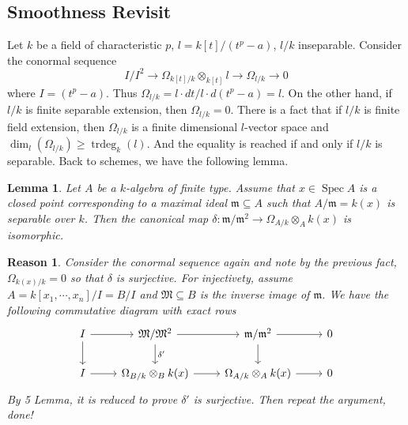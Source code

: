 \documentclass{ctexart}
\newtheorem{lemma}{Lemma}[section]
\newtheorem{reason}{Reason}[section]
\newcommand{\trdeg}{\operatorname{trdeg}}
\newcommand{\spec}{\operatorname{Spec}}
\begin{document}
\subsection{Smoothness Revisit}
Let $k$ be a field of characteristic $p$, $l = k[t]/(t^{p} - a)$, $l/k$ inseparable.
Consider the conormal sequence 
\begin{equation*}
    I/I^{2} \longrightarrow \Omega_{k[t]/k} \otimes_{k[t]} l \longrightarrow \Omega_{l/k} \longrightarrow 0
\end{equation*}
where $I = (t^{p} - a)$.
Thus $\Omega_{l/k} = l \cdot dt/l \cdot d(t^{p} - a) = l$.
On the other hand, if $l/k$ is finite separable extension, then $\Omega_{l/k} = 0$.
There is a fact that if $l/k$ is finite field extension, then $\Omega_{l/k}$ is a finite dimensional $l$-vector space and $\dim_{l}(\Omega_{l/k}) \ge \trdeg_{k}(l)$.
And the equality is reached if and only if $l/k$ is separable.
Back to schemes, we have the following lemma.
\begin{lemma}
    Let $A$ be a $k$-algebra of finite type.
    Assume that $x\in \spec A$ is a closed point corresponding to a maximal ideal $\mathfrak{m} \subseteq A$ such that $A/\mathfrak{m} = k(x)$ is separable over $k$.
    Then the canonical map $\delta: \mathfrak{m}/\mathfrak{m}^{2} \longrightarrow \Omega_{A/k} \otimes_{A} k(x)$ is isomorphic.
    \label{Lemma 9.2}
\end{lemma}
\begin{reason}
    Consider the conormal sequence again and note by the previous fact, $\Omega_{k(x)/k} = 0$ so that $\delta$ is surjective.
    For injectivety, assume $A = k[x_{1}, \cdots, x_{n}]/I = B/I$ and $\mathfrak{M} \subseteq B$ is the inverse image of $\mathfrak{m}$.
    We have the following commutative diagram with exact rows
    \begin{equation*}
        \begin{tikzcd}
            I \arrow[r] \arrow[d] &
            \mathfrak{M}/\mathfrak{M}^{2} \arrow[r] \arrow[d, "{\delta'}"] &
            \mathfrak{m}/\mathfrak{m}^{2} \arrow[r] \arrow[d] &
            0 \\
            I \arrow[r] &
            \Omega_{B/k} \otimes_{B} k(x) \arrow[r] &
            \Omega_{A/k} \otimes_{A} k(x) \arrow[r] &
            0
        \end{tikzcd}
    \end{equation*}
    By 5 Lemma, it is reduced to prove $\delta'$ is surjective.
    Then repeat the argument, done!
\end{reason}
\end{document}
